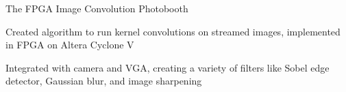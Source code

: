     \vspace{-0.6em}
\begin{comment}
\begin{cventries}
  \cventry
    {}
    {Img2Latex2}
    {}
    {}
    {
    \vspace{-1.5em}
      \begin{cvitems}
	\item {Gathered and processed training data, created and tuned neural networks, created segmentation algorithm for transforming images of equations and handwriting to \LaTeX. Works occasionally if I write very carefully!}
      \end{cvitems}
    }
\end{cventries}
    \vspace{-0.6em}
\begin{cventries}
  \cventry
    {}
    {Chess Bot, An Automated Chess Bot}
    {}
    {}
    {
    \vspace{-1.5em}
      \begin{cvitems}
	\item {As part of a class final project, created a chess bot which could beat me at chess (I'm not very good). Implemented alpha-beta pruning, killer-move heuristic, and transposition tables for move selection}
      \end{cvitems}
    }
    \vspace{-0.6em}
\end{cventries}
\end{comment}

\begin{cventries}
  \cventry
    {}
    {The FPGA Image Convolution Photobooth}
    {}
    {}
    {
    \vspace{-1.5em}
      \begin{cvitems}
	\item {Created algorithm to run kernel convolutions on streamed images, implemented in FPGA on Altera Cyclone V}
    \item {Integrated with camera and VGA, creating a variety of filters like Sobel edge detector, Gaussian blur, and image sharpening}
      \end{cvitems}
    }
    \vspace{-1.0em}
\end{cventries}
